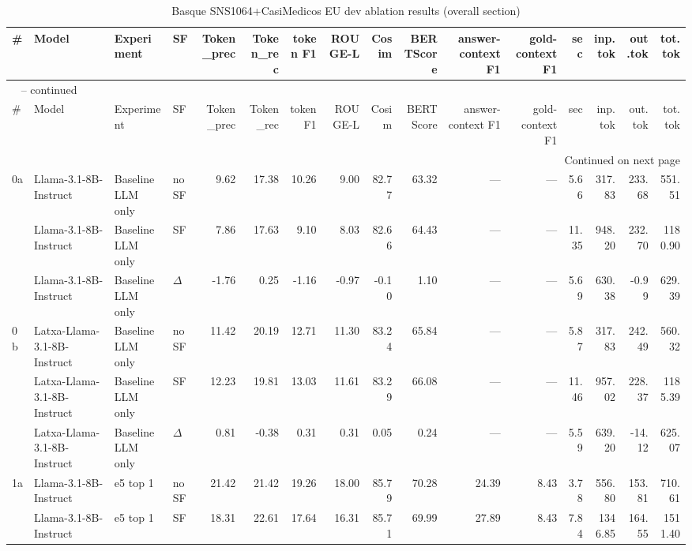 \begin{landscape}
\begin{footnotesize}
\setlength{\LTcapwidth}{\linewidth}
\begin{longtable}{l l l l r r r r r r r r r r r r}
\caption{Basque SNS1064+CasiMedicos EU dev ablation results (overall section)} \label{tab:eu-mixed} \\
\toprule
\# & Model & Experiment & SF & Token\_prec & Token\_rec & token F1 & ROUGE-L & Cosim & BERTScore & answer-context F1 & gold-context F1 & sec & inp.tok & out.tok & tot.tok \\
\midrule
\endfirsthead
\multicolumn{16}{l}{\tablename\ \thetable{} -- continued} \\
\toprule
\# & Model & Experiment & SF & Token\_prec & Token\_rec & token F1 & ROUGE-L & Cosim & BERTScore & answer-context F1 & gold-context F1 & sec & inp.tok & out.tok & tot.tok \\
\midrule
\endhead
\midrule
\multicolumn{16}{r}{Continued on next page} \\
\endfoot
\bottomrule
\endlastfoot
0a & Llama-3.1-8B-Instruct & Baseline LLM only & noSF & 9.62 & 17.38 & 10.26 & 9.00 & 82.77 & 63.32 & --- & --- & 5.66 & 317.83 & 233.68 & 551.51 \\
 & Llama-3.1-8B-Instruct & Baseline LLM only & SF & 7.86 & 17.63 & 9.10 & 8.03 & 82.66 & 64.43 & --- & --- & 11.35 & 948.20 & 232.70 & 1180.90 \\
 & Llama-3.1-8B-Instruct & Baseline LLM only & $\Delta$ & -1.76 & 0.25 & -1.16 & -0.97 & -0.10 & 1.10 & --- & --- & 5.69 & 630.38 & -0.99 & 629.39 \\
0b & Latxa-Llama-3.1-8B-Instruct & Baseline LLM only & noSF & 11.42 & 20.19 & 12.71 & 11.30 & 83.24 & 65.84 & --- & --- & 5.87 & 317.83 & 242.49 & 560.32 \\
 & Latxa-Llama-3.1-8B-Instruct & Baseline LLM only & SF & 12.23 & 19.81 & 13.03 & 11.61 & 83.29 & 66.08 & --- & --- & 11.46 & 957.02 & 228.37 & 1185.39 \\
 & Latxa-Llama-3.1-8B-Instruct & Baseline LLM only & $\Delta$ & 0.81 & -0.38 & 0.31 & 0.31 & 0.05 & 0.24 & --- & --- & 5.59 & 639.20 & -14.12 & 625.07 \\
\midrule
1a & Llama-3.1-8B-Instruct & e5 top 1 & noSF & 21.42 & 21.42 & 19.26 & 18.00 & 85.79 & 70.28 & 24.39 & 8.43 & 3.78 & 556.80 & 153.81 & 710.61 \\
 & Llama-3.1-8B-Instruct & e5 top 1 & SF & 18.31 & 22.61 & 17.64 & 16.31 & 85.71 & 69.99 & 27.89 & 8.43 & 7.84 & 1346.85 & 164.55 & 1511.40 \\

\end{longtable}
\end{footnotesize}
\end{landscape}
